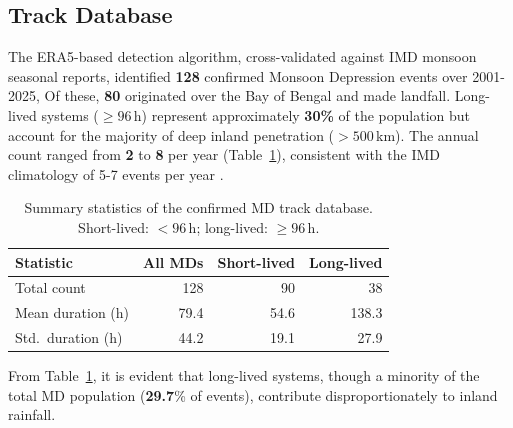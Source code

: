 \subsection{Track Database}
\label{subsec:track_database}

The ERA5-based detection algorithm, cross-validated against IMD
monsoon seasonal reports, identified \textbf{128} confirmed Monsoon
Depression events over 2001-2025, Of these, \textbf{80} originated
over the Bay of Bengal and made landfall. Long-lived systems ($\geq
96$\,h) represent approximately \textbf{30\%} of the population but
account for the majority of deep inland penetration ($> 500$\,km).
The annual count ranged from \textbf{2} to \textbf{8} per year
(Table~\ref{tab:track_stats}), consistent with the IMD climatology of
5-7 events per year \citep{kishtawal2013enhancement}.

\begin{table}[H]
  \centering
  \caption[MD track database statistics (2001-2025)]{Summary statistics of the
  confirmed MD track database. Short-lived: $<96$\,h; long-lived: $\geq 96$\,h.}
  \label{tab:track_stats}
  \begin{tabular}{l r r r}
    \toprule
    \textbf{Statistic}                      & \textbf{All MDs} &
    \textbf{Short-lived} & \textbf{Long-lived} \\
    \midrule
    Total count                             & 128              &
    90                   & 38                  \\
    Mean duration (h)                       & 79.4             & 54.6
    & 138.3                \\
    Std.\ duration (h)                      & 44.2             & 19.1
    & 27.9                 \\
    \bottomrule
  \end{tabular}
\end{table}

From Table~\ref{tab:track_stats}, it is evident that long-lived
systems, though a minority of the total MD population
(\textbf{29.7}\% of events), contribute disproportionately to inland rainfall.

